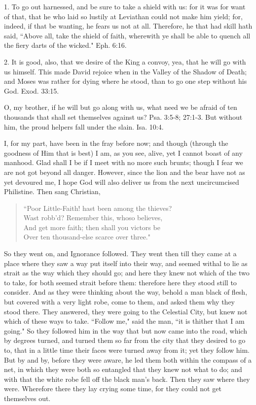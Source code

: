 1. To go out harnessed, and be sure to take a shield with us: for it was for want of that, that he who laid so lustily at Leviathan could not make him yield; for, indeed, if that be wanting, he fears us not at all. Therefore, he that had skill hath said, ``Above all, take the shield of faith, wherewith ye shall be able to quench all the fiery darts of the wicked." Eph. 6:16.

2. It is good, also, that we desire of the King a convoy, yea, that he will go with us himself. This made David rejoice when in the Valley of the Shadow of Death; and Moses was rather for dying where he stood, than to go one step without his God. Exod. 33:15.

O, my brother, if he will but go along with us, what need we be afraid of ten thousands that shall set themselves against us? Psa. 3:5-8; 27:1-3. But without him, the proud helpers fall under the slain. Isa. 10:4.

I, for my part, have been in the fray before now; and though (through the goodness of Him that is best) I am, as you see, alive, yet I cannot boast of any manhood. Glad shall I be if I meet with no more such brunts; though I fear we are not got beyond all danger. However, since the lion and the bear have not as yet devoured me, I hope God will also deliver us from the next uncircumcised Philistine. Then sang Christian,
\begin{verse}
``Poor Little-Faith! hast been among the thieves?\\
Wast robb'd? Remember this, whoso believes,\\
And get more faith; then shall you victors be\\
Over ten thousand-else scarce over three."\\
\end{verse}
So they went on, and Ignorance followed. They went then till they came at a place where they saw a way put itself into their way, and seemed withal to lie as strait as the way which they should go; and here they knew not which of the two to take, for both seemed strait before them: therefore here they stood still to consider. And as they were thinking about the way, behold a man black of flesh, but covered with a very light robe, come to them, and asked them why they stood there. They answered, they were going to the Celestial City, but knew not which of these ways to take. ``Follow me," said the man, ``it is thither that I am going." So they followed him in the way that but now came into the road, which by degrees turned, and turned them so far from the city that they desired to go to, that in a little time their faces were turned away from it; yet they follow him. But by and by, before they were aware, he led them both within the compass of a net, in which they were both so entangled that they knew not what to do; and with that the white robe fell off the black man's back. Then they saw where they were. Wherefore there they lay crying some time, for they could not get themselves out.

